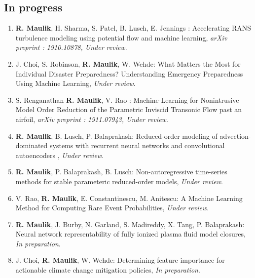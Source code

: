 \documentclass[letterpaper]{article}
\begin{document}
\subsection*{In progress}

\begin{enumerate}

\item \textbf{R. Maulik}, H. Sharma, S. Patel, B. Lusch, E. Jennings : Accelerating RANS turbulence modeling using potential flow and machine learning, {\it arXiv preprint : 1910.10878, Under review}.

\item J. Choi, S. Robinson, \textbf{R. Maulik}, W. Wehde: What Matters the Most for Individual Disaster Preparedness? Understanding Emergency Preparedness Using Machine Learning, {\it Under review}.

\item S. Renganathan \textbf{R. Maulik}, V. Rao : Machine-Learning for Nonintrusive Model Order Reduction of the Parametric Inviscid Transonic Flow past an airfoil, {\it arXiv preprint : 1911.07943, Under review}.

\item \textbf{R. Maulik}, B. Lusch, P. Balaprakash: Reduced-order modeling of advection-dominated systems with recurrent neural networks and convolutional autoencoders , {\it Under review}.

\item \textbf{R. Maulik}, P. Balaprakash, B. Lusch: Non-autoregressive time-series methods for stable parameteric reduced-order models, {\it Under review}.

\item V. Rao, \textbf{R. Maulik}, E. Constantinescu, M. Anitescu: A Machine Learning Method for Computing Rare Event Probabilities, {\it Under review}.

\item \textbf{R. Maulik}, J. Burby, N. Garland, S. Madireddy, X. Tang, P. Balaprakash: Neural network representability of fully ionized plasma fluid model closures, {\it In preparation}.

\item J. Choi, \textbf{R. Maulik}, W. Wehde: Determining feature importance for actionable climate change mitigation policies, {\it In preparation}.




\end{enumerate}
\end{document}
